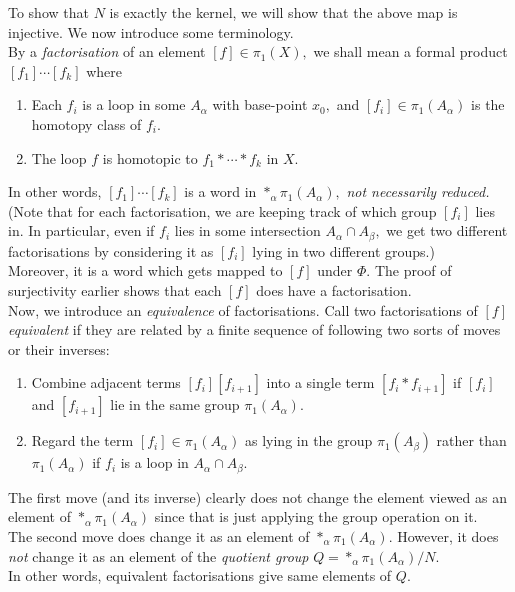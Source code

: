 \documentclass[12pt]{article}
\begin{document}
	To show that $N$ is exactly the kernel, we will show that the above map is injective. We now introduce some terminology.\\
	By a \emph{factorisation} of an element $[f] \in \pi_1(X),$ we shall mean a formal product $[f_1]\cdots[f_k]$ where
	\begin{enumerate}
		\item Each $f_i$ is a loop in some $A_\alpha$ with base-point $x_0,$ and $[f_i] \in \pi_1(A_\alpha)$ is the homotopy class of $f_i.$
		\item The loop $f$ is homotopic to $f_1*\cdots*f_k$ in $X.$
	\end{enumerate}
	In other words, $[f_1]\cdots[f_k]$ is a word in $*_\alpha \pi_1(A_\alpha),$ \emph{not necessarily reduced.} \\
	(Note that for each factorisation, we are keeping track of which group $[f_i]$ lies in. In particular, even if $f_i$ lies in some intersection $A_\alpha \cap A_\beta,$ we get two different factorisations by considering it as $[f_i]$ lying in two different groups.) \\
	Moreover, it is a word which gets mapped to $[f]$ under $\Phi.$ The proof of surjectivity earlier shows that each $[f]$ does have a factorisation. \\
	Now, we introduce an \emph{equivalence} of factorisations. Call two factorisations of $[f]$ \emph{equivalent} if they are related by a finite sequence of following two sorts of moves or their inverses:
	\begin{enumerate}
		\item Combine adjacent terms $[f_i][f_{i+1}]$ into a single term $[f_i*f_{i+1}]$ if $[f_i]$ and $[f_{i+1}]$ lie in the same group $\pi_1(A_\alpha).$
		\item Regard the term $[f_i] \in \pi_1(A_\alpha)$ as lying in the group $\pi_1(A_\beta)$ rather than $\pi_1(A_\alpha)$ if $f_i$ is a loop in $A_\alpha \cap A_\beta.$
	\end{enumerate}
	The first move (and its inverse) clearly does not change the element viewed as an element of $*_\alpha\pi_1(A_\alpha)$ since that is just applying the group operation on it.\\
	The second move does change it as an element of $*_\alpha\pi_1(A_\alpha).$ However, it does \emph{not} change it as an element of the \emph{quotient group} $Q = *_\alpha\pi_1(A_\alpha)/N.$\\
	In other words, equivalent factorisations give same elements of $Q.$
\end{document}
